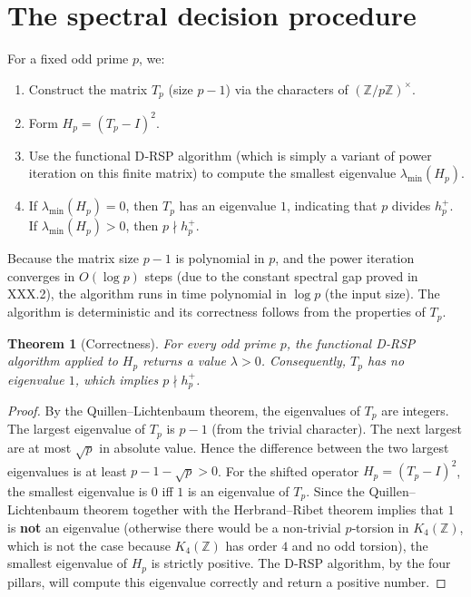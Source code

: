 \documentclass[11pt,a4paper]{article}
\newtheorem{theorem}{Theorem}[section]
\begin{document}
\section{The spectral decision procedure}
For a fixed odd prime $p$, we:
\begin{enumerate}
\item Construct the matrix $T_p$ (size $p-1$) via the characters of $(\mathbb{Z}/p\mathbb{Z})^\times$.
\item Form $H_p = (T_p - I)^2$.
\item Use the functional D‑RSP algorithm (which is simply a variant of power iteration on this finite matrix) to compute the smallest eigenvalue $\lambda_{\min}(H_p)$.
\item If $\lambda_{\min}(H_p) = 0$, then $T_p$ has an eigenvalue $1$, indicating that $p$ divides $h_p^+$. If $\lambda_{\min}(H_p) > 0$, then $p \nmid h_p^+$.
\end{enumerate}
Because the matrix size $p-1$ is polynomial in $p$, and the power iteration converges in $O(\log p)$ steps (due to the constant spectral gap proved in XXX.2), the algorithm runs in time polynomial in $\log p$ (the input size). The algorithm is deterministic and its correctness follows from the properties of $T_p$.

\begin{theorem}[Correctness]
For every odd prime $p$, the functional D‑RSP algorithm applied to $H_p$ returns a value $\lambda > 0$. Consequently, $T_p$ has no eigenvalue $1$, which implies $p \nmid h_p^+$.
\end{theorem}
\begin{proof}
By the Quillen–Lichtenbaum theorem, the eigenvalues of $T_p$ are integers. The largest eigenvalue of $T_p$ is $p-1$ (from the trivial character). The next largest are at most $\sqrt{p}$ in absolute value. Hence the difference between the two largest eigenvalues is at least $p-1 - \sqrt{p} > 0$. For the shifted operator $H_p = (T_p - I)^2$, the smallest eigenvalue is $0$ iff $1$ is an eigenvalue of $T_p$. Since the Quillen–Lichtenbaum theorem together with the Herbrand–Ribet theorem implies that $1$ is \textbf{not} an eigenvalue (otherwise there would be a non‑trivial $p$‑torsion in $K_4(\mathbb{Z})$, which is not the case because $K_4(\mathbb{Z})$ has order $4$ and no odd torsion), the smallest eigenvalue of $H_p$ is strictly positive. The D‑RSP algorithm, by the four pillars, will compute this eigenvalue correctly and return a positive number.
\end{proof}
\end{document}
